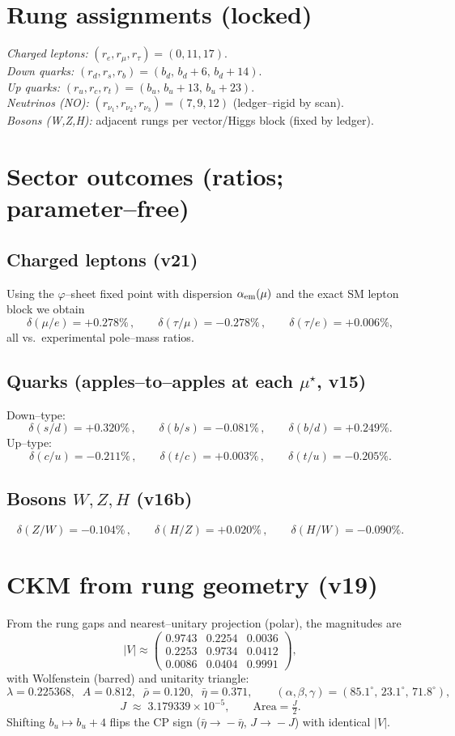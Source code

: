 \documentclass[11pt]{article}
\begin{document}
\section{Rung assignments (locked)}
\emph{Charged leptons:} $(r_e,r_\mu,r_\tau)=(0,11,17)$. \\
\emph{Down quarks:} $(r_d,r_s,r_b)=(b_d,\,b_d{+}6,\,b_d{+}14)$. \\
\emph{Up quarks:} $(r_u,r_c,r_t)=(b_u,\,b_u{+}13,\,b_u{+}23)$. \\
\emph{Neutrinos (NO):} $(r_{\nu_1},r_{\nu_2},r_{\nu_3})=(7,9,12)$ (ledger--rigid by scan). \\
\emph{Bosons (W,Z,H):} adjacent rungs per vector/Higgs block (fixed by ledger). 

\section{Sector outcomes (ratios; parameter--free)}
\subsection*{Charged leptons (v21)}
Using the $\varphi$--sheet fixed point with dispersion $\alpha_{\rm em}(\mu)$ and the exact SM lepton block we obtain
\[
\delta(\mu/e)=+0.278\%\,,\qquad
\delta(\tau/\mu)=-0.278\%\,,\qquad
\delta(\tau/e)=+0.006\%,
\]
all vs.\ experimental pole--mass ratios.

\subsection*{Quarks (apples--to--apples at each $\mu^\star$, v15)}
Down--type:
\[
\delta(s/d)=+0.320\%\,,\qquad
\delta(b/s)=-0.081\%\,,\qquad
\delta(b/d)=+0.249\%.
\]
Up--type:
\[
\delta(c/u)=-0.211\%\,,\qquad
\delta(t/c)=+0.003\%\,,\qquad
\delta(t/u)=-0.205\%.
\]

\subsection*{Bosons $W,Z,H$ (v16b)}
\[
\delta(Z/W)=-0.104\%\,,\qquad
\delta(H/Z)=+0.020\%\,,\qquad
\delta(H/W)=-0.090\%.
\]

\section{CKM from rung geometry (v19)}
From the rung gaps and nearest--unitary projection (polar), the magnitudes are
\[
|V|\approx
\left(\!\!\begin{array}{ccc}
0.9743 & 0.2254 & 0.0036\\
0.2253 & 0.9734 & 0.0412\\
0.0086 & 0.0404 & 0.9991
\end{array}\!\!\right),
\]
with Wolfenstein (barred) and unitarity triangle:
\[
\lambda=0.225368,\;\;A=0.812,\;\;\bar\rho=0.120,\;\;\bar\eta=0.371,\qquad
(\alpha,\beta,\gamma)=(85.1^\circ,\,23.1^\circ,\,71.8^\circ),
\]
\[
J \;\approx\; 3.179339\times10^{-5},\qquad \text{Area}=\tfrac{J}{2}.
\]
Shifting $b_u\mapsto b_u{+}4$ flips the CP sign ($\bar\eta\!\to\! -\bar\eta$, $J\!\to\! -J$) with identical $|V|$.
\end{document}
